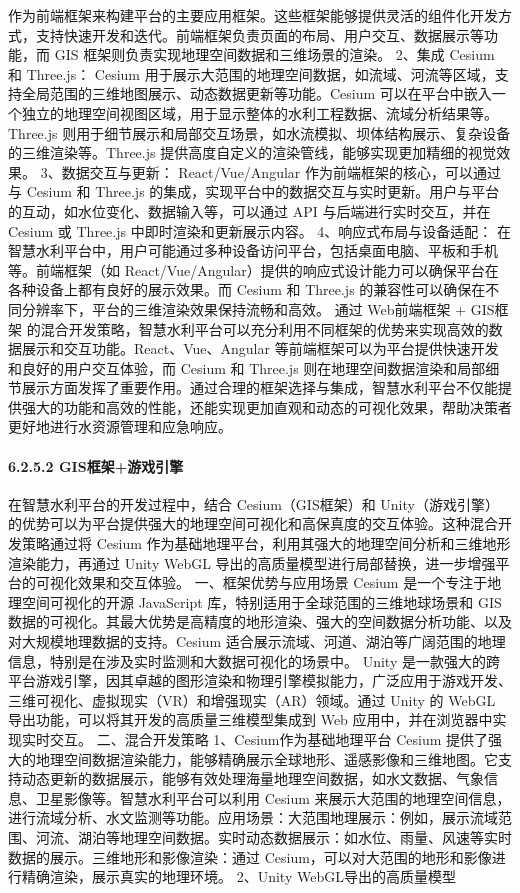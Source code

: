 作为前端框架来构建平台的主要应用框架。这些框架能够提供灵活的组件化开发方式，支持快速开发和迭代。前端框架负责页面的布局、用户交互、数据展示等功能，而 GIS 框架则负责实现地理空间数据和三维场景的渲染。 2、集成 Cesium 和 Three.js： Cesium 用于展示大范围的地理空间数据，如流域、河流等区域，支持全局范围的三维地图展示、动态数据更新等功能。Cesium 可以在平台中嵌入一个独立的地理空间视图区域，用于显示整体的水利工程数据、流域分析结果等。Three.js 则用于细节展示和局部交互场景，如水流模拟、坝体结构展示、复杂设备的三维渲染等。Three.js 提供高度自定义的渲染管线，能够实现更加精细的视觉效果。 3、数据交互与更新： React/Vue/Angular 作为前端框架的核心，可以通过与 Cesium 和 Three.js 的集成，实现平台中的数据交互与实时更新。用户与平台的互动，如水位变化、数据输入等，可以通过 API 与后端进行实时交互，并在 Cesium 或 Three.js 中即时渲染和更新展示内容。 4、响应式布局与设备适配： 在智慧水利平台中，用户可能通过多种设备访问平台，包括桌面电脑、平板和手机等。前端框架（如 React/Vue/Angular）提供的响应式设计能力可以确保平台在各种设备上都有良好的展示效果。而 Cesium 和 Three.js 的兼容性可以确保在不同分辨率下，平台的三维渲染效果保持流畅和高效。 通过 Web前端框架 + GIS框架 的混合开发策略，智慧水利平台可以充分利用不同框架的优势来实现高效的数据展示和交互功能。React、Vue、Angular 等前端框架可以为平台提供快速开发和良好的用户交互体验，而 Cesium 和 Three.js 则在地理空间数据渲染和局部细节展示方面发挥了重要作用。通过合理的框架选择与集成，智慧水利平台不仅能提供强大的功能和高效的性能，还能实现更加直观和动态的可视化效果，帮助决策者更好地进行水资源管理和应急响应。 \paragraph{6.2.5.2 GIS框架+游戏引擎}\label{gisux6846ux67b6ux6e38ux620fux5f15ux64ce} 在智慧水利平台的开发过程中，结合 Cesium（GIS框架）和 Unity（游戏引擎）的优势可以为平台提供强大的地理空间可视化和高保真度的交互体验。这种混合开发策略通过将 Cesium 作为基础地理平台，利用其强大的地理空间分析和三维地形渲染能力，再通过 Unity WebGL 导出的高质量模型进行局部替换，进一步增强平台的可视化效果和交互体验。 一、框架优势与应用场景 Cesium 是一个专注于地理空间可视化的开源 JavaScript 库，特别适用于全球范围的三维地球场景和 GIS 数据的可视化。其最大优势是高精度的地形渲染、强大的空间数据分析功能、以及对大规模地理数据的支持。Cesium 适合展示流域、河道、湖泊等广阔范围的地理信息，特别是在涉及实时监测和大数据可视化的场景中。 Unity 是一款强大的跨平台游戏引擎，因其卓越的图形渲染和物理引擎模拟能力，广泛应用于游戏开发、三维可视化、虚拟现实（VR）和增强现实（AR）领域。通过 Unity 的 WebGL 导出功能，可以将其开发的高质量三维模型集成到 Web 应用中，并在浏览器中实现实时交互。 二、混合开发策略 1、Cesium作为基础地理平台 Cesium 提供了强大的地理空间数据渲染能力，能够精确展示全球地形、遥感影像和三维地图。它支持动态更新的数据展示，能够有效处理海量地理空间数据，如水文数据、气象信息、卫星影像等。智慧水利平台可以利用 Cesium 来展示大范围的地理空间信息，进行流域分析、水文监测等功能。应用场景：大范围地理展示：例如，展示流域范围、河流、湖泊等地理空间数据。实时动态数据展示：如水位、雨量、风速等实时数据的展示。三维地形和影像渲染：通过 Cesium，可以对大范围的地形和影像进行精确渲染，展示真实的地理环境。 2、Unity WebGL导出的高质量模型 